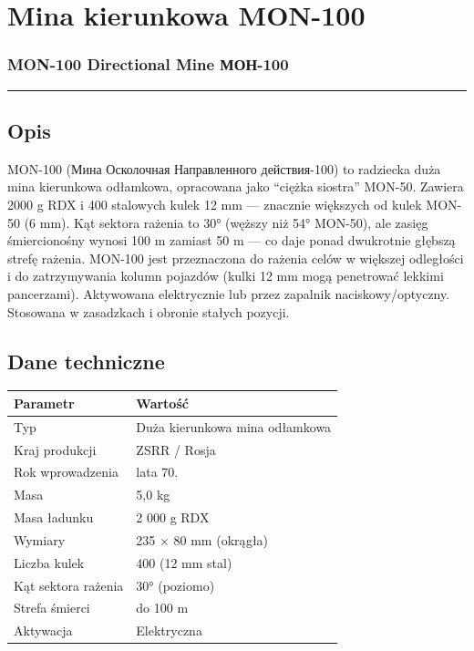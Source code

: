 \documentclass[12pt,openany,oneside]{book}
\begin{document}
\chapter{Mina kierunkowa MON-100}\label{mina-kierunkowa-mon-100}

\subsection{MON-100 Directional Mine \textbar{}
МОН-100}\label{mon-100-directional-mine-ux43cux43eux43d-100}

\begin{center}\rule{0.5\linewidth}{0.5pt}\end{center}

\section{Opis}\label{opis-113}

MON-100 (Мина Осколочная Направленного действия-100) to radziecka duża
mina kierunkowa odłamkowa, opracowana jako ``ciężka siostra'' MON-50.
Zawiera 2000 g RDX i 400 stalowych kulek 12 mm --- znacznie większych od
kulek MON-50 (6 mm). Kąt sektora rażenia to 30° (węższy niż 54° MON-50),
ale zasięg śmiercionośny wynosi 100 m zamiast 50 m --- co daje ponad
dwukrotnie głębszą strefę rażenia. MON-100 jest przeznaczona do rażenia
celów w większej odległości i do zatrzymywania kolumn pojazdów (kulki 12
mm mogą penetrować lekkimi pancerzami). Aktywowana elektrycznie lub
przez zapalnik naciskowy/optyczny. Stosowana w zasadzkach i obronie
stałych pozycji.

\section{Dane techniczne}\label{dane-techniczne-113}

\begin{longtable}[]{@{}ll@{}}
\toprule\noalign{}
Parametr & Wartość \\
\midrule\noalign{}
\endhead
\bottomrule\noalign{}
\endlastfoot
Typ & Duża kierunkowa mina odłamkowa \\
Kraj produkcji & ZSRR / Rosja \\
Rok wprowadzenia & lata 70. \\
Masa & 5,0 kg \\
Masa ładunku & 2 000 g RDX \\
Wymiary & 235 × 80 mm (okrągła) \\
Liczba kulek & 400 (12 mm stal) \\
Kąt sektora rażenia & 30° (poziomo) \\
Strefa śmierci & do 100 m \\
Aktywacja & Elektryczna \\
\end{longtable}
\end{document}
